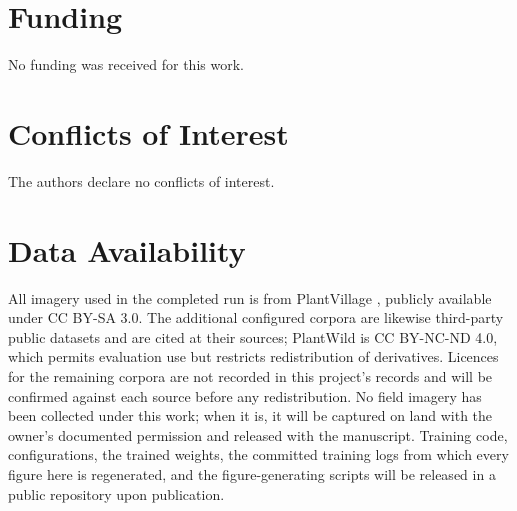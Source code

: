 \documentclass[journal]{IEEEtran}
\begin{document}
\section*{Funding}
No funding was received for this work.

\section*{Conflicts of Interest}
The authors declare no conflicts of interest.

\section*{Data Availability}
All imagery used in the completed run is from PlantVillage
\cite{hughes2015plantvillage}, publicly available under CC BY-SA 3.0. The
additional configured corpora are likewise third-party public datasets and
are cited at their sources; PlantWild is CC BY-NC-ND 4.0, which permits
evaluation use but restricts redistribution of derivatives. Licences for
the remaining corpora are not recorded in this project's records and will
be confirmed against each source before any redistribution. No field
imagery has been collected under this work; when it is, it will be captured
on land with the owner's documented permission and released with the
manuscript. Training code, configurations, the trained weights, the
committed training logs from which every figure here is regenerated, and
the figure-generating scripts will be released in a public repository upon
publication.



\end{document}
